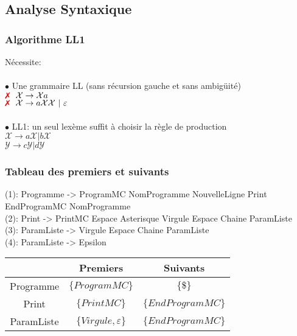 \subsection{Analyse Syntaxique}

\begin{frame}
    
\end{frame}

\begin{frame}
    \frametitle{Algorithme LL1\esp}

    Nécessite:\\
    \vspace{0.05cm}\\{
    $\bullet$ Une grammaire LL (sans récursion gauche et sans ambigüité)\\
    $\text{\textcolor{red}{\ding{55}}} \ \ \mathcal{X} \rightarrow \mathcal{X}a$\\
    $\text{\textcolor{red}{\ding{55}}} \ \  \mathcal{X} \rightarrow a\mathcal{X}\mathcal{X} \ | \ \varepsilon  $\\}
    \vspace{0.25cm}\\
    {
    $\bullet$ LL1: un seul lexème suffit à choisir la règle de production\\
    $\mathcal{X} \rightarrow a\mathcal{X} | b\mathcal{X} $\\
    $\mathcal{Y} \rightarrow c\mathcal{Y} | d\mathcal{Y} $
}


\end{frame}

\begin{frame}
    \frametitle{Tableau des premiers et suivants\esp}
    \small
    (1): Programme -> ProgramMC NomProgramme NouvelleLigne Print EndProgramMC NomProgramme\\
    (2): Print -> PrintMC Espace Asterisque Virgule Espace Chaine ParamListe\\
    (3): ParamListe -> Virgule Espace Chaine ParamListe\\
    (4): ParamListe ->  Epsilon \\

    \begin{tabular}{|c|c|c|}
    \hline
        & Premiers & Suivants\\  
    \hline
    Programme & $\{ProgramMC\}$ & $\{\$\}$ \\
    \hline
    Print & $\{PrintMC\}$ & $\{EndProgramMC\}$ \\
    \hline
    ParamListe & $\{ Virgule, \varepsilon \}$ & $\{EndProgramMC\}$\\
    \hline

    \end{tabular}

\end{frame}

